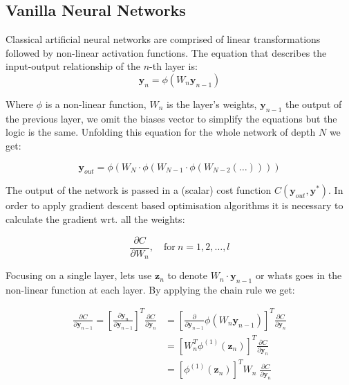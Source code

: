 \documentclass{article}
\begin{document}
    \subsection{Vanilla Neural Networks}
    Classical artificial neural networks are comprised of linear transformations followed by non-linear activation functions.
    The equation that describes the input-output relationship of the $n$-th layer is:
    \begin{equation}
        \bm{y}_{n} = \phi( W_{n} \bm{y}_{n-1} )
    \end{equation}

    Where $\phi$ is a non-linear function, $W_n$ is the layer's weights, $\bm{y}_{n-1}$ the output of the previous layer, we omit the biases vector to simplify the equations but the logic is the same.
    Unfolding this equation for the whole network of depth $N$ we get:

    \begin{equation}
        \bm{y}_{out} = \phi ( W_{N} \cdot \phi(W_{N-1} \cdot  \phi(W_{N-2}( \dots ))))
    \end{equation}

    The output of the network is passed in a (scalar) cost function $C(\bm{y}_{out},\bm{y}^*)$.
    In order to apply gradient descent based optimisation algorithms it is necessary to calculate the gradient wrt.
    all the weights:

    \begin{equation}
        \frac{ \partial C}{\partial W_{n} }, \quad \text{for} \ n=1,2,\dots,l
    \end{equation}

    Focusing on a single layer, lets use $\textbf{z}_{n}$ to denote $W_{n}\cdot \textbf{y}_{n-1}$ or whats goes in the non-linear function at each layer.
    By applying the chain rule we get:

    \begin{align}
        \frac{ \partial C}{\partial \textbf{y}_{n-1} }
        =
        \left[ \frac{ \partial \textbf{y}_{n}}{\partial \textbf{y}_{n-1}  } \right]^T
        \frac{ \partial C}{\partial \textbf{y}_{n} }
        &=
        \left[ \frac{ \partial}{\partial \textbf{y}_{n-1} } \phi(W_n \textbf{y}_{n-1}) \right]^T
        \frac{ \partial C}{\partial \textbf{y}_{n} }
        \\
        &=
        \left[ W_n^T \phi^{(1)}( \pmb{z}_n ) \right]^T
        \frac{ \partial C}{\partial \textbf{y}_{n} }
        \\
        &=
        \left[ \phi^{(1)}( \pmb{z}_n ) \right]^T
        W_n \;
        \frac{ \partial C}{\partial \textbf{y}_{n} }
    \end{align}
\end{document}
